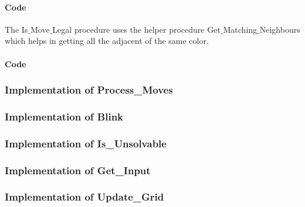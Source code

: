 \paragraph{Code}
\noindent
\begin{centering}

\end{centering}

The Is$\_$Move$\_$Legal procedure uses the helper procedure Get$\_$Matching$\_$Neighbours which helps in getting all the adjacent \sqs of the same color.

\paragraph{Code}
\noindent
\begin{centering}

\end{centering}

\subsubsection{Implementation of Process\_Moves}


\subsubsection{Implementation of Blink}


\subsubsection{Implementation of Is\_Unsolvable}


\subsubsection{Implementation of Get\_Input}


\subsubsection{Implementation of Update\_Grid}


